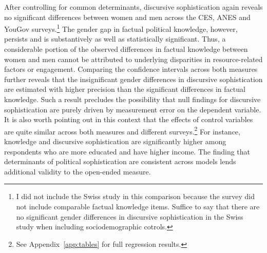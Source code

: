 After controlling for common determinants, discursive sophistication again reveals no significant differences between women and men across the CES, ANES and YouGov surveys.\footnote{I did not include the Swiss study in this comparison because the survey did not include comparable factual knowledge items. Suffice to say that there are no significant gender differences in discursive sophistication in the Swiss study when including sociodemographic cotrols.} The gender gap in factual political knowledge, however, persists and is substantively as well as statistically significant. Thus, a considerable portion of the observed differences in factual knowledge between women and men cannot be attributed to underlying disparities in resource-related factors or engagement. Comparing the confidence intervals across both measures further reveals that the insignificant gender differences in discursive sophistication are estimated with higher precision than the significant differences in factual knowledge. Such a result precludes the possibility that null findings for discursive sophistication are purely driven by measurement error on the dependent variable. It is also worth pointing out in this context that the effects of control variables are quite similar across both measures and different surveys.\footnote{See Appendix~\ref{app:tables} for full regression results.} For instance, knowledge and discursive sophistication are significantly higher among respondents who are more educated and have higher income. The finding that determinants of political sophistication are consistent across models lends additional validity to the open-ended measure.%



